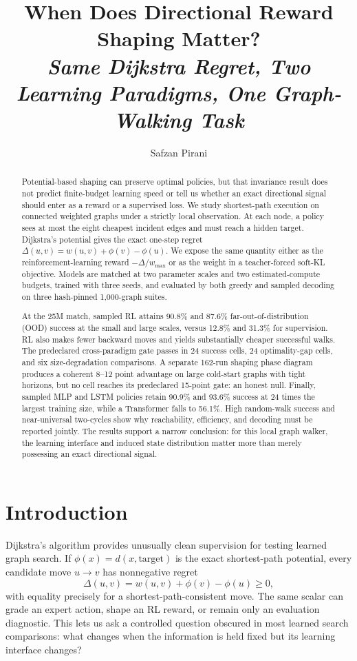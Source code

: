 \documentclass[10pt,twocolumn]{article}
\title{\vspace{-1.4em}\bfseries
When Does Directional Reward Shaping Matter?\\[0.35em]
{\normalsize\mdseries\itshape
Same Dijkstra Regret, Two Learning Paradigms, One Graph-Walking Task}}
\author{Safzan Pirani}
\date{}
\newcommand{\dlt}{\Delta}
\newcommand{\ph}{\phi}
\newcommand{\wmax}{w_{\max}}
\begin{document}
\maketitle
\vspace{-1.8em}

\begin{abstract}
Potential-based shaping can preserve optimal policies, but that invariance
result does not predict finite-budget learning speed or tell us whether an
exact directional signal should enter as a reward or a supervised loss.  We
study shortest-path execution on connected weighted graphs under a strictly
local observation.  At each node, a policy sees at most the eight cheapest
incident edges and must reach a hidden target.  Dijkstra's potential gives the
exact one-step regret
$\dlt(u,v)=w(u,v)+\ph(v)-\ph(u)$.
We expose the same quantity either as the reinforcement-learning reward
$-\dlt/\wmax$ or as the weight in a teacher-forced soft-KL objective.  Models
are matched at two parameter scales and two estimated-compute budgets, trained
with three seeds, and evaluated by both greedy and sampled decoding on three
hash-pinned 1,000-graph suites.

At the 25M match, sampled RL attains 90.8\% and 87.6\% far-out-of-distribution
(OOD) success at the small and large scales, versus 12.8\% and 31.3\% for
supervision.  RL also makes fewer backward moves and yields substantially
cheaper successful walks.  The predeclared cross-paradigm gate passes in 24
success cells, 24 optimality-gap cells, and six size-degradation comparisons.
A separate 162-run shaping phase diagram produces a coherent 8--12 point
advantage on large cold-start graphs with tight horizons, but no cell reaches
its predeclared 15-point gate: an honest null.  Finally, sampled MLP and LSTM
policies retain 90.9\% and 93.6\% success at 24 times the largest training
size, while a Transformer falls to 56.1\%.  High random-walk success and
near-universal two-cycles show why reachability, efficiency, and decoding must
be reported jointly.  The results support a narrow conclusion: for this local
graph walker, the learning interface and induced state distribution matter
more than merely possessing an exact directional signal.
\end{abstract}

\section{Introduction}

Dijkstra's algorithm provides unusually clean supervision for testing learned
graph search.  If
$\ph(x)=d(x,\mathrm{target})$ is the exact shortest-path potential, every
candidate move $u\!\rightarrow\!v$ has nonnegative regret
\begin{equation}
  \dlt(u,v)=w(u,v)+\ph(v)-\ph(u)\geq 0,
  \label{eq:regret}
\end{equation}
with equality precisely for a shortest-path-consistent move.  The same scalar
can grade an expert action, shape an RL reward, or remain only an evaluation
diagnostic.  This lets us ask a controlled question obscured in most learned
search comparisons: what changes when the information is held fixed but its
learning interface changes?
\end{document}

